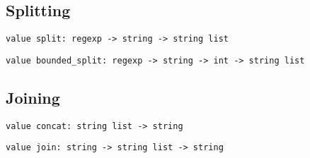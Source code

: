 \subsection*{Splitting }\begin{verbatim}
value split: regexp -> string -> string list
\end{verbatim}
%
\begin{comment}
 \verbsplit r s splits \verbs into substrings, taking as delimiters
           the substrings that match \verbr, and returns the list of substrings.
           For instance, \verbsplit (regexp "[ \t]+") s splits \verbs into
           blank-separated words. 
\end{comment}
\begin{verbatim}
value bounded_split: regexp -> string -> int -> string list
\end{verbatim}
%
\begin{comment}
 Same as \verbsplit, but splits into at most \verbn substrings,
           where \verbn is the extra integer parameter. 
\end{comment}
\subsection*{Joining }\begin{verbatim}
value concat: string list -> string
\end{verbatim}
%
\begin{comment}
 Catenate a list of string. 
\end{comment}
\begin{verbatim}
value join: string -> string list -> string
\end{verbatim}
%
\begin{comment}
 Catenate a list of string. The first argument is a separator, which
           is inserted between the strings. 
\end{comment}
